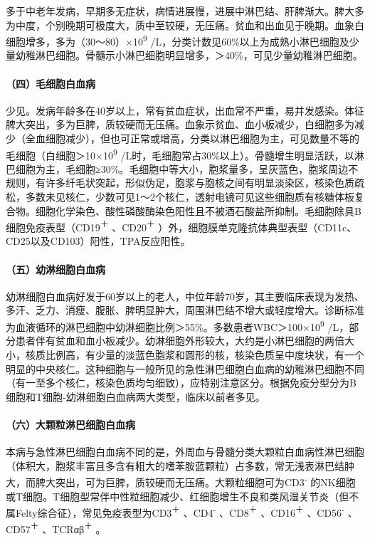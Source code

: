 多于中老年发病，早期多无症状，病情进展慢，进展中淋巴结、肝脾渐大。脾大多为中度，个别晚期可极度大，质中至较硬，无压痛。贫血和出血见于晚期。血象白细胞增多，多为（30～80）×10\textsuperscript{9}
/L，分类计数见60\%以上为成熟小淋巴细胞及少量幼稚淋巴细胞。骨髓示小淋巴细胞明显增多，＞40\%，可见少量幼稚淋巴细胞。

\paragraph{（四）毛细胞白血病}

少见。发病年龄多在40岁以上，常有贫血症状，出血常不严重，易并发感染。体征脾大突出，多为巨脾，质较硬而无压痛。血象示贫血、血小板减少，白细胞多为减少（全血细胞减少），但也可正常或增高，分类以淋巴细胞为主，可见数量不等的毛细胞（白细胞＞10×10\textsuperscript{9}
/L时，毛细胞常占30\%以上）。骨髓增生明显活跃，以淋巴细胞为主，毛细胞≥30\%。毛细胞中等大小，胞浆量多，呈灰蓝色，胞浆周边不规则，有许多纤毛状突起，形似伪足，胞浆与胞核之间有明显淡染区，核染色质疏松，多数未见核仁，少数可见1～2个核仁，透射电镜可见这些细胞质有核糖体板复合物。细胞化学染色、酸性磷酸酶染色阳性且不被酒石酸盐所抑制。毛细胞除具B细胞免疫表型（CD19\textsuperscript{＋}
、CD20\textsuperscript{＋}
）外，细胞膜单克隆抗体典型表型（CD11c、CD25以及CD103）阳性，TPA反应阳性。

\paragraph{（五）幼淋细胞白血病}

幼淋细胞白血病好发于60岁以上的老人，中位年龄70岁，其主要临床表现为发热、多汗、乏力、消瘦、腹胀、脾明显肿大，周围淋巴结不增大或轻度增大。诊断标准为血液循环的淋巴细胞中幼淋细胞比例＞55\%。多数患者WBC＞100×10\textsuperscript{9}
/L，部分患者伴有贫血和血小板减少。幼淋细胞外形较大，大约是小淋巴细胞的两倍大小，核质比例高，有少量的淡蓝色胞浆和圆形的核，核染色质呈中度块状，有一个明显的中央核仁。这种细胞与一般所见的急性淋巴细胞白血病的幼稚淋巴细胞不同（有一至多个核仁，核染色质均匀细致），应特别注意区分。根据免疫分型分为B细胞和T细胞-幼淋细胞白血病两大类型，临床以前者多见。

\paragraph{（六）大颗粒淋巴细胞白血病}

本病与急性淋巴细胞白血病不同的是，外周血与骨髓分类大颗粒白血病性淋巴细胞（体积大，胞浆丰富且多含有粗大的嗜苯胺蓝颗粒）占多数，常无浅表淋巴结肿大，而脾大突出，可为巨脾，质较硬而无压痛。大颗粒细胞可为CD3\textsuperscript{-}
的NK细胞或T细胞。T细胞型常伴中性粒细胞减少、红细胞增生不良和类风湿关节炎（但不属Felty综合征），常见免疫表型为CD3\textsuperscript{＋}
、CD4\textsuperscript{-} 、CD8\textsuperscript{＋}
、CD16\textsuperscript{＋} 、CD56\textsuperscript{-}
、CD57\textsuperscript{＋} 、TCRαβ\textsuperscript{＋} 。


